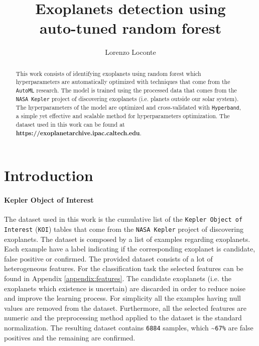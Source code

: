\documentclass[11pt, a4paper]{article}
\date{}
\title{Exoplanets detection using \\ auto-tuned random forest}
\author{Lorenzo Loconte}
\begin{document}
\maketitle
\begin{abstract}
  This work consists of identifying exoplanets using random forest which hyperparameters are automatically optimized with techniques that come from the \texttt{AutoML} research.
  The model is trained using the processed data that comes from the \texttt{NASA Kepler} project of discovering exoplanets (i.e. planets outside our solar system).
  The hyperparameters of the model are optimized and cross-validated with \texttt{Hyperband}, a simple yet effective and scalable method for hyperparameters optimization.
  The dataset used in this work can be found at \textbf{https://exoplanetarchive.ipac.caltech.edu}.
\end{abstract}

\section{Introduction}
  \paragraph{Kepler Object of Interest}
    The dataset used in this work is the cumulative list of the \texttt{Kepler Object of Interest} (\texttt{KOI}) tables that come from the \texttt{NASA Kepler} project of discovering exoplanets.
    The dataset is composed by a list of examples regarding exoplanets. Each example have a label indicating if the corresponding exoplanet is candidate, false positive or confirmed. The provided dataset consists of a lot of heterogeneous features. For the classification task the selected features can be found in Appendix \ref{appendix:features}. The candidate exoplanets (i.e. the exoplanets which existence is uncertain) are discarded in order to reduce noise and improve the learning process.
    For simplicity all the examples having null values are removed from the dataset. Furthermore, all the selected features are numeric and the preprocessing method applied to the dataset is the standard normalization.
    The resulting dataset contains \texttt{6884} samples, which \textasciitilde \texttt{67\%} are false positives and the remaining are confirmed.
    
\end{document}
